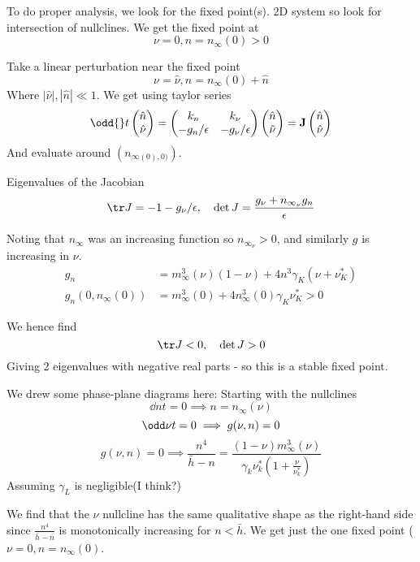 \documentclass{X:/Documents/Coding/Latex/myassignment}
\begin{document}
To do proper analysis, we look for the fixed point(s). 2D system so look for intersection of nullclines.
We get the fixed point at
\[\nu = 0, n =n_\infty(0) > 0\]

Take a linear perturbation near the fixed point
\[\nu = \hat{\nu}, n = n_{\infty}(0) + \hat{n}\]
Where $|\hat{\nu}| , |\hat{n}| \ll 1$. We get using taylor series
\[\odd{}t \begin{pmatrix}
	\hat{n}\\\hat{\nu}
\end{pmatrix} = \begin{pmatrix}
	k_n & k_{\nu}\\-g_n/\epsilon & -g_\nu / \epsilon
\end{pmatrix} \begin{pmatrix}
	\hat{n}\\\hat{\nu} 
\end{pmatrix} = \mathbf{J} \begin{pmatrix}
	\hat{n}\\\hat{\nu}
\end{pmatrix}\]
And evaluate around $(n_{\infty(0),0)})$.

Eigenvalues of the Jacobian
\[\tr J = -1 - g_\nu / \epsilon, \quad \det J = \frac{g_\nu + n_{\infty_\nu} g_n}{\epsilon}\]


Noting that $n_{\infty}$ was an increasing function so $n_{\infty_\nu} > 0$, and similarly $g$ is increasing in $\nu$. 
\begin{align*}
	g_n &= m_{\infty}^3 (\nu) (1- \nu) + 4n^3 \gamma_K( \nu + \nu_K^*)\\
	g_n(0,n_{\infty}(0)) &= m_{\infty}^3(0) + 4n^3_{\infty}(0) \gamma_K \nu_K^* > 0
\end{align*}



We hence find
\[\tr J < 0, \quad \det J > 0\]
Giving 2 eigenvalues with negative real parts - so this is a stable fixed point.



We drew some phase-plane diagrams here:
Starting with the nullclines
\[\dd nt = 0 \implies n = n_{\infty}(\nu)\]
\[\odd \nu t = 0 \implies g(\nu,n) = 0\]
\[g(\nu,n) = 0 \implies \frac{n^4}{\bar{h} - n} = \frac{(1- \nu) m_{\infty}^3(\nu)}{\gamma_k \nu_k^*(1+\frac{\nu}{\nu_k^*})}\]
Assuming $\gamma_L$ is negligible(I think?)

We find that the $\nu$ nullcline has the same qualitative shape as the right-hand side since $\frac{n^4}{\bar{h} - n}$ is monotonically increasing for $n < \bar{h}$.
We get just the one fixed point ($\nu = 0, n = n_{\infty}(0)$.
\end{document}
